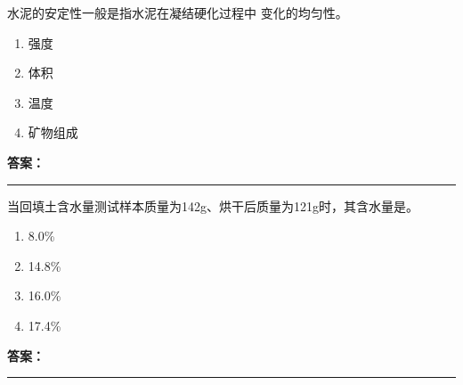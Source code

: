 \documentclass[UTF8,fontset=fandol,11pt]{ctexart}
\newcommand{\answerline}{\textcolor{answerred}{\rule{2.4cm}{0.7pt}}}
\begin{document}
\vspace{0.2em}

\begin{quizbox}[title={乱序第 175 题｜第四章混凝土结构工程}]

水泥的安定性一般是指水泥在凝结硬化过程中 变化的均匀性。\\

\begin{enumerate}[label=\Alph*.]

\item 强度

\item 体积

\item 温度

\item 矿物组成

\end{enumerate}

\textbf{\textcolor{answerred}{答案：}} \answerline

\end{quizbox}

\vspace{0.2em}

\begin{quizbox}[title={乱序第 176 题｜第一章土方工程}]

当回填土含水量测试样本质量为142g、烘干后质量为121g时，其含水量是。\\

\begin{enumerate}[label=\Alph*.]

\item 8.0\%

\item 14.8\%

\item 16.0\%

\item 17.4\%

\end{enumerate}

\textbf{\textcolor{answerred}{答案：}} \answerline

\end{quizbox}

\vspace{0.2em}
\end{document}
